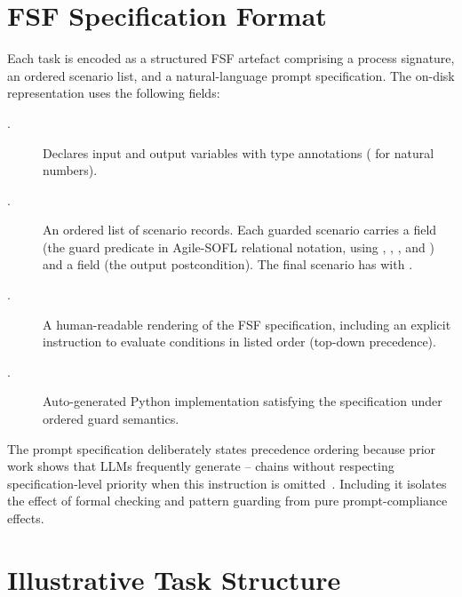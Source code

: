 \section{FSF Specification Format}
\label{sec:bench:format}

Each task is encoded as a structured FSF artefact comprising a process
signature, an ordered scenario list, and a natural-language prompt
specification.  The on-disk representation uses the following fields:

\begin{description}
  \item[.]
        Declares input and output variables with type annotations
        ( for natural numbers).
  \item[.]
        An ordered list of scenario records.  Each guarded scenario carries
        a  field (the guard predicate in Agile-SOFL relational
        notation, using , , , and \code{\&\&}) and
        a  field (the output postcondition).  The final scenario
        has  with .
  \item[.]
        A human-readable rendering of the FSF specification, including an
        explicit instruction to evaluate conditions in listed order
        (top-down precedence).
  \item[.]
        Auto-generated Python implementation satisfying the specification
        under ordered guard semantics.
\end{description}

The prompt specification deliberately states precedence ordering because
prior work shows that LLMs frequently generate -- chains
without respecting specification-level priority when this instruction is
omitted~\citep{sun2024clover,loughridge2024dafnybench}.  Including it isolates the effect of formal checking and pattern
guarding from pure prompt-compliance effects.

\section{Illustrative Task Structure}
\label{sec:bench:example}

